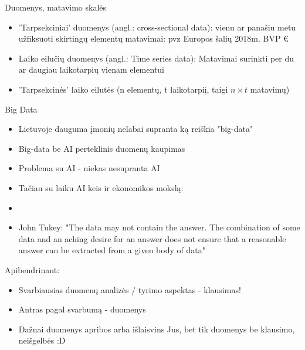 \documentclass[11pt,xcolor=table]{beamer}
\begin{document}

\begin{frame}{Duomenys, matavimo skalės}
\begin{itemize}
\item 'Tarpsekciniai' duomenys (angl.: cross-sectional data): vienu ar panašiu metu užfiksuoti skirtingų elementų matavimai: pvz Europos šalių 2018m. BVP €
\item Laiko eilučių duomenys (angl.: Time series data): Matavimai surinkti per du ar daugiau laikotarpių vienam elementui
\item 'Tarpsekcinės' laiko eilutės (n elementų, t laikotarpiį, taigi $n \times t $ matavimų)
\end{itemize}
\end{frame}

\begin{frame}{Big Data}
\begin{itemize}
\item Lietuvoje dauguma įmonių nelabai supranta ką reiškia "big-data"
\item Big-data be AI perteklinis duomenų kaupimas
\item Problema su AI - niekas nesupranta AI
\item Tačiau su laiku AI keis ir ekonomikos mokslą:
\item \href{https://www.aeaweb.org/webcasts/2019/aea-afa-joint-luncheon-impact-of-machine-learning}{\color{blue}{Video: AEA AFA Joint Luncheon - The Impact of Machine Learning on Econometrics and Economics}}
\item John Tukey: "The data may not contain the answer. The combination of some data and an aching desire for an answer does not ensure that a reasonable answer can be extracted from a given body of data" 
\end{itemize}
\end{frame}


\begin{frame}{Apibendrinant:}
\begin{itemize}
\item Svarbiausias duomenų analizės / tyrimo aspektas - klausimas!
\item Antras pagal svarbumą - duomenys
\item Dažnai duomenys apribos arba išlaisvins Jus, bet tik duomenys be klausimo, neišgelbės :D
\end{itemize}
\end{frame}
\end{document}
